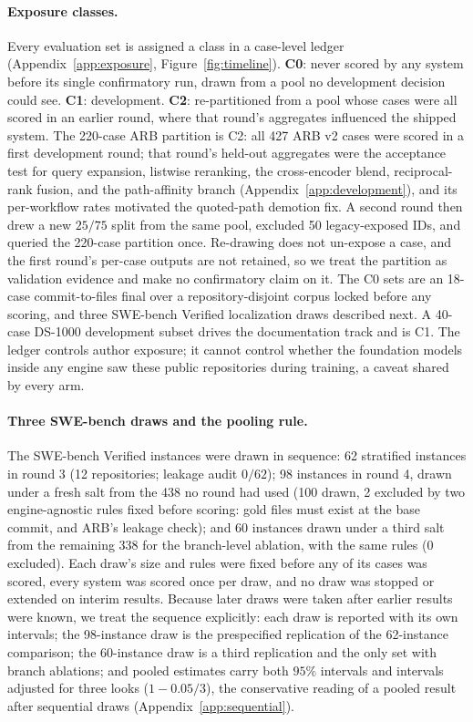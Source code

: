 \documentclass{article}
\begin{document}
\paragraph{Exposure classes.} Every evaluation set is assigned a class in a case-level ledger (Appendix~\ref{app:exposure}, Figure~\ref{fig:timeline}). \textbf{C0}: never scored by any system before its single confirmatory run, drawn from a pool no development decision could see. \textbf{C1}: development. \textbf{C2}: re-partitioned from a pool whose cases were all scored in an earlier round, where that round's aggregates influenced the shipped system. The 220-case ARB partition is C2: all 427 ARB v2 cases were scored in a first development round; that round's held-out aggregates were the acceptance test for query expansion, listwise reranking, the cross-encoder blend, reciprocal-rank fusion, and the path-affinity branch (Appendix~\ref{app:development}), and its per-workflow rates motivated the quoted-path demotion fix. A second round then drew a new $25/75$ split from the same pool, excluded 50 legacy-exposed IDs, and queried the 220-case partition once. Re-drawing does not un-expose a case, and the first round's per-case outputs are not retained, so we treat the partition as validation evidence and make no confirmatory claim on it. The C0 sets are an 18-case commit-to-files final over a repository-disjoint corpus locked before any scoring, and three SWE-bench Verified localization draws described next. A 40-case DS-1000 development subset drives the documentation track and is C1. The ledger controls author exposure; it cannot control whether the foundation models inside any engine saw these public repositories during training, a caveat shared by every arm.

\paragraph{Three SWE-bench draws and the pooling rule.} The SWE-bench Verified instances were drawn in sequence: 62 stratified instances in round 3 (12 repositories; leakage audit $0/62$); 98 instances in round 4, drawn under a fresh salt from the 438 no round had used (100 drawn, 2 excluded by two engine-agnostic rules fixed before scoring: gold files must exist at the base commit, and ARB's leakage check); and 60 instances drawn under a third salt from the remaining 338 for the branch-level ablation, with the same rules (0 excluded). Each draw's size and rules were fixed before any of its cases was scored, every system was scored once per draw, and no draw was stopped or extended on interim results. Because later draws were taken after earlier results were known, we treat the sequence explicitly: each draw is reported with its own intervals; the 98-instance draw is the prespecified replication of the 62-instance comparison; the 60-instance draw is a third replication and the only set with branch ablations; and pooled estimates carry both $95\%$ intervals and intervals adjusted for three looks ($1-0.05/3$), the conservative reading of a pooled result after sequential draws (Appendix~\ref{app:sequential}).
\end{document}
